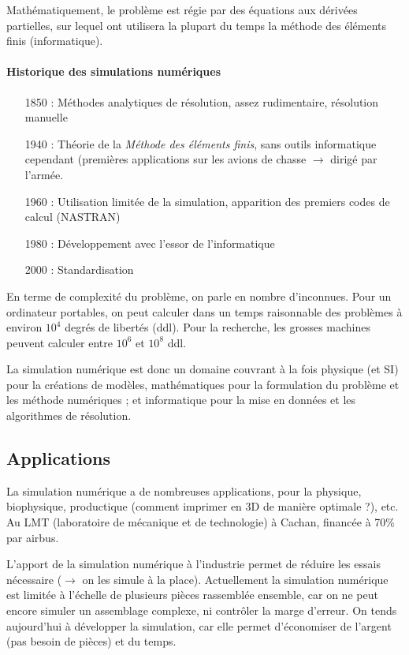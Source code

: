 \documentclass{article}
\begin{document}
Mathématiquement, le problème est régie par des équations aux dérivées partielles, sur lequel ont utilisera la plupart du temps la méthode des éléments finis (informatique).
\bigskip

\paragraph{Historique des simulations numériques}
\begin{itemize}
\item[1850 :] Méthodes analytiques de résolution, assez rudimentaire, résolution manuelle
\item[1940 :] Théorie de la \emph{Méthode des éléments finis}, sans outils informatique cependant (premières applications sur les avions de chasse $\to$ dirigé par l'armée.
\item[1960 :] Utilisation limitée de la simulation, apparition des premiers codes de calcul (NASTRAN)
\item[1980 :] Développement avec l'essor de l'informatique
\item[2000 :] Standardisation
\end{itemize}
\bigskip

En terme de complexité du problème, on parle en nombre d'inconnues. Pour un ordinateur portables, on peut calculer dans un temps raisonnable des problèmes à environ $10^4$ degrés de libertés (ddl). Pour la recherche, les grosses machines peuvent calculer entre $10^6$ et $10^8$ ddl.
\bigskip


La simulation numérique est donc un domaine couvrant à la fois physique (et SI) pour la créations de modèles, mathématiques pour la formulation du problème et les méthode numériques ; et informatique pour la mise en données et les algorithmes de résolution.


\subsection{Applications}
La simulation numérique a de nombreuses applications, pour la physique, biophysique, productique (comment imprimer en 3D de manière optimale ?), etc. Au LMT (laboratoire de mécanique et de technologie) à Cachan, financée à 70\% par airbus.

L'apport de la simulation numérique à l'industrie permet de réduire les essais nécessaire ($\to$ on les simule à la place). Actuellement la simulation numérique est limitée à l'échelle de plusieurs pièces rassemblée ensemble, car on ne peut encore simuler un assemblage complexe, ni contrôler la marge d'erreur. On tends aujourd'hui à développer la simulation, car elle permet d'économiser de l'argent (pas besoin de pièces) et du temps.
\end{document}
